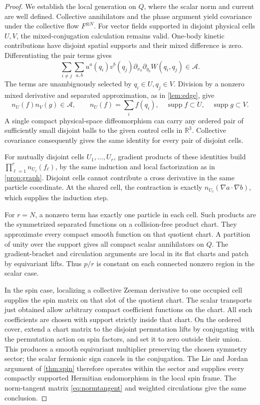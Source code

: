 \documentclass[11pt]{article}
\numberwithin{equation}{section}
\theoremstyle{definition}
\newcommand{\R}{\mathbb R}
\newcommand{\Acal}{\mathcal A}
\newcommand{\supp}{\operatorname{supp}}
\begin{document}
\begin{proof}
We establish the local generation on \(Q\), where the scalar norm and current are well defined. Collective annihilators and the phase argument yield covariance under the collective flow \(F^{\otimes N}\). For vector fields supported in disjoint physical cells \(U,V\), the mixed-conjugation calculation remains valid. One-body kinetic contributions have disjoint spatial supports and their mixed difference is zero. Differentiating the pair terms gives
\[
 \sum_{i\ne j}\sum_{a,b}
 u^a(q_i)v^b(q_j)\partial_{x_a}\partial_{y_b}W(q_i,q_j)\in\Acal.
\]
The terms are unambiguously selected by \(q_i\in U,q_j\in V\). Division by a nonzero mixed derivative and separated approximation, as in \cref{lem:edge}, give
\[
 n_U(f)n_V(g)\in\Acal,\qquad
 n_U(f)=\sum_i f(q_i),\quad \supp f\subset U,\quad \supp g\subset V.
\]
A single compact physical-space diffeomorphism can carry any ordered pair of sufficiently small disjoint balls to the given control cells in \(\R^3\). Collective covariance consequently gives the same identity for every pair of disjoint cells.

For mutually disjoint cells \(U_1,\ldots,U_r\), gradient products of these identities build
\(\prod_{\ell=1}^r n_{U_\ell}(f_\ell)\), by the same induction and local factorization as in \cref{prop:graph}. Disjoint cells cannot contribute a cross derivative in the same particle coordinate. At the shared cell, the contraction is exactly
\(n_{U_\ell}(\nabla a\cdot\nabla b)\), which supplies the induction step.

For \(r=N\), a nonzero term has exactly one particle in each cell. Such products are the symmetrized separated functions on a collision-free product chart. They approximate every compact smooth function on that quotient chart. A partition of unity over the support gives all compact scalar annihilators on \(Q\). The gradient-bracket and circulation arguments are local in its flat charts and patch by equivariant lifts. Thus \(p/r\) is constant on each connected nonzero region in the scalar case.

In the spin case, localizing a collective Zeeman derivative to one occupied cell supplies the spin matrix on that slot of the quotient chart. The scalar transports just obtained allow arbitrary compact coefficient functions on the chart. All such coefficients are chosen with support strictly inside that chart. On the ordered cover, extend a chart matrix to the disjoint permutation lifts by conjugating with the permutation action on spin factors, and set it to zero outside their union. This produces a smooth equivariant multiplier preserving the chosen symmetry sector; the scalar fermionic sign cancels in the conjugation. The Lie and Jordan argument of \cref{thm:spin} therefore operates within the sector and supplies every compactly supported Hermitian endomorphism in the local spin frame. The norm-tangent matrix \eqref{eq:normtangent} and weighted circulations give the same conclusion.


\end{proof}
\end{document}
